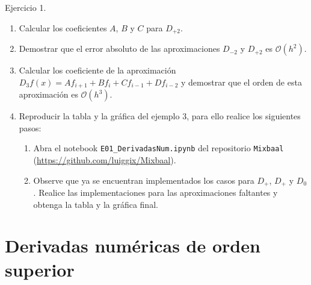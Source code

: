 \documentclass{beamer}
\begin{document}
\begin{frame}
	
{\footnotesize 	
\begin{exampleblock}{Ejercicio 1.}
\begin{enumerate}
	\item Calcular los coeficientes $A$, $B$ y $C$ para $D_{+2}$.
	\item Demostrar que el error absoluto de las aproximaciones $D_{-2}$ y $D_{+2}$ es $\mathcal{O}(h^2)$.
	\item Calcular los coeficiente de la aproximación $D_{3} f(x) = A f_{i+1} + B f_{i} + C f_{i-1} + D f_{i-2}$
	y demostrar que el orden de esta aproximación es $\mathcal{O}(h^3)$.
	\item Reproducir la tabla y la gráfica del ejemplo 3, para ello realice los siguientes pasos:
	\begin{enumerate}[a]
		\item {\scriptsize Abra el notebook \texttt{E01\_DerivadasNum.ipynb} del repositorio \texttt{Mixbaal}
		(\url{https://github.com/luiggix/Mixbaal}).}
		\item {\scriptsize Observe que ya se encuentran implementados los casos para $D_{+}$, $D_{+}$ y $D_{0}$.
		Realice las implementaciones para las aproximaciones faltantes y obtenga la tabla y la gráfica final.}
	\end{enumerate}
\end{enumerate}
\end{exampleblock}
}
	
\end{frame}

\section{Derivadas numéricas de orden superior}
\end{document}

